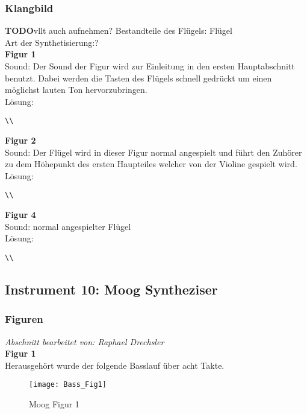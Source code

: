 \documentclass[
10pt, %
a4paper, %
oneside, %
headinclude,footinclude, %
BCOR5mm, %
]{scrartcl}
\begin{document}
\subsubsection{Klangbild}
{\color{red}\textbf{TODO}}vllt auch aufnehmen?
Bestandteile des Flügels: Flügel\\
Art der Synthetisierung:?\\
\noindent \textbf{Figur 1}\\
Sound: Der Sound der Figur wird zur Einleitung in den ersten Hauptabschnitt benutzt. Dabei werden die Tasten des Flügels 
schnell gedrückt um einen möglichst lauten Ton hervorzubringen.\\
Lösung:\\
\begin{lstlisting}
\\
\end{lstlisting}
\noindent \textbf{Figur 2}\\
Sound: Der Flügel wird in dieser Figur normal angespielt und führt den Zuhörer zu dem Höhepunkt des ersten Haupteiles welcher von der Violine gespielt wird.\\
Lösung:\\
\begin{lstlisting}
\\
\end{lstlisting}
\noindent \textbf{Figur 4}\\
Sound: normal angespielter Flügel\\
Lösung:\\
\begin{lstlisting}
\\
\end{lstlisting}

\subsection{Instrument 10: Moog Syntheziser}
\subsubsection{Figuren}
\textit{Abschnitt bearbeitet von: Raphael Drechsler}\\

\noindent\textbf{Figur 1}\\
Herausgehört wurde der folgende Basslauf über acht Takte.\\
\begin{figure}[h]
	\centering 
	\texttt{[image: Bass\_Fig1]} 
	\caption{Moog Figur 1}
\end{figure}
\end{document}
